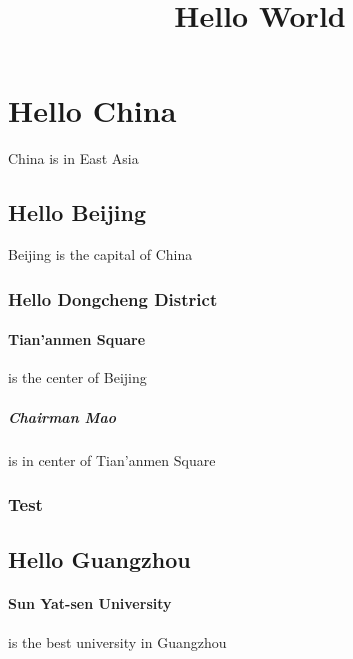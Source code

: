 \documentclass{article}
\title{Hello World}
\begin{document}
    \maketitle
    \section{Hello China} China is in East Asia
    \subsection{Hello Beijing} Beijing is the capital of China
    \subsubsection{Hello Dongcheng District}
    \paragraph{Tian'anmen Square} is the center of Beijing
    \subparagraph{Chairman Mao} is in center of Tian'anmen Square
    
    \subsubsection{Test}


    \subsection{Hello Guangzhou}
    \paragraph{Sun Yat-sen University} is the best university in Guangzhou
\end{document}
